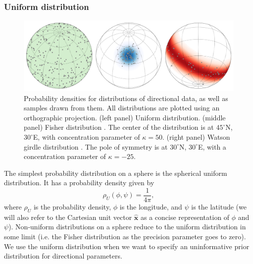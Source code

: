 \documentclass[11pt,letterpaper]{article}
\begin{document}
\subsubsection*{Uniform distribution}
\begin{figure}
\centering
\includegraphics[width=\textwidth]{fig_direction_distributions.png}
\caption[Spherical probability distributions.]{Probability densities for distributions of directional data, as well as samples drawn from them. All distributions are plotted using an orthographic projection. (left panel) Uniform distribution. (middle panel) Fisher distribution \citep{Fisher1987b}. The center of the distribution is at $45^\circ$N, $30^\circ$E, with concentration parameter of $\kappa=50$. (right panel) Watson girdle distribution \citep{Watson1965a}. The pole of symmetry is at $30^\circ$N, $30^\circ$E, with a concentration parameter of $\kappa=-25$.}
\label{fig:distributions}
\end{figure}

The simplest probability distribution on a sphere is the spherical uniform distribution. It has a probability density given by
\begin{equation}
  \rho_U(\phi, \psi) = \frac{1}{4 \pi},
\end{equation}
where $\rho_U$ is the probability density, $\phi$ is the longitude, and $\psi$ is the latitude (we will also refer to the Cartesian unit vector $\hat{\mathbf{x}}$ as a concise representation of $\phi$ and $\psi$). Non-uniform distributions on a sphere reduce to the uniform distribution in some limit (i.e. the Fisher distribution as the precision parameter goes to zero). We use the uniform distribution when we want to specify an uninformative prior distribution for directional parameters.
\end{document}

